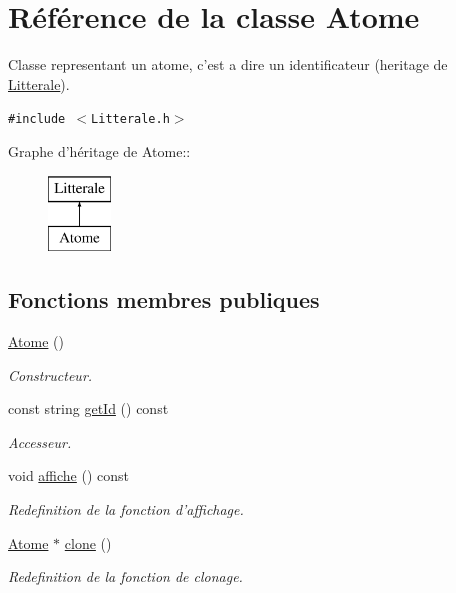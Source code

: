 \hypertarget{class_atome}{
\section{Référence de la classe Atome}
\label{class_atome}
}
Classe representant un atome, c'est a dire un identificateur (heritage de \hyperlink{class_litterale}{Litterale}).  


{\tt \#include $<$Litterale.h$>$}

Graphe d'héritage de Atome::\begin{figure}[H]
\begin{center}
\leavevmode
\includegraphics[height=2cm]{class_atome}
\end{center}
\end{figure}
\subsection*{Fonctions membres publiques}
\begin{CompactItemize}
\item 
\hypertarget{class_atome_8dfba20d5fba684abbd6be86d35744d5}{
\hyperlink{class_atome_8dfba20d5fba684abbd6be86d35744d5}{Atome} ()}
\label{class_atome_8dfba20d5fba684abbd6be86d35744d5}

\begin{CompactList}\small\item\em Constructeur. \item\end{CompactList}\item 
const string \hyperlink{class_atome_1ea077587e5f200c22bbec3784110452}{getId} () const 
\begin{CompactList}\small\item\em Accesseur. \item\end{CompactList}\item 
\hypertarget{class_atome_232aaac3d37c1d3d4acb6d6031e97e09}{
void \hyperlink{class_atome_232aaac3d37c1d3d4acb6d6031e97e09}{affiche} () const }
\label{class_atome_232aaac3d37c1d3d4acb6d6031e97e09}

\begin{CompactList}\small\item\em Redefinition de la fonction d'affichage. \item\end{CompactList}\item 
\hypertarget{class_atome_5cc14942990769be4455a1a4c813584d}{
\hyperlink{class_atome}{Atome} $\ast$ \hyperlink{class_atome_5cc14942990769be4455a1a4c813584d}{clone} ()}
\label{class_atome_5cc14942990769be4455a1a4c813584d}

\begin{CompactList}\small\item\em Redefinition de la fonction de clonage. \item\end{CompactList}\end{CompactItemize}


